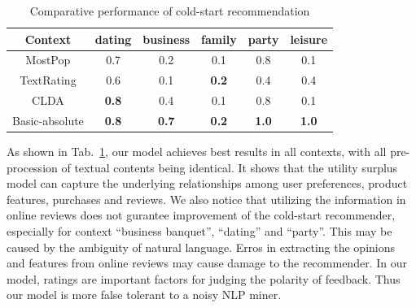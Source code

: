 \documentclass[preprint,12pt]{elsarticle}
\begin{document}
\begin{table}\label{tab:p10}
	\centering
	\caption{Comparative performance of cold-start recommendation}
		\begin{tabular}{|c|c|c|c|c|c|}	
		\hline
Context	&			dating	&business	&family&	party	&leisure\\\hline\hline
MostPop&	0.7&	0.2	&0.1&0.8	&0.1\\\hline
TextRating	&0.6	&0.1	&\textbf{0.2}&	0.4	&0.4\\\hline
CLDA	&\textbf{0.8}	&0.4&	0.1	&0.8&	0.1\\\hline
Basic-absolute	&\textbf{0.8}	&\textbf{0.7}&	\textbf{0.2}&	\textbf{1.0}&	\textbf{1.0}\\\hline
		\end{tabular}
\end{table}

As shown in Tab.~\ref{tab:p10}, our model achieves best results in all contexts, with all pre-procession of textual contents being identical. It shows that the utility surplus model can capture the underlying relationships among user preferences, product features, purchases and reviews. We also notice that utilizing the information in online reviews does not gurantee improvement of the cold-start recommender, especially for context ``business banquet'', ``dating'' and ``party''. This may be caused by the ambiguity of natural language. Erros in extracting the opinions and features from online reviews may cause damage to the recommender. In our model, ratings are important factors for judging the polarity of feedback. Thus our model is more false tolerant to a noisy NLP miner.  
\end{document}

